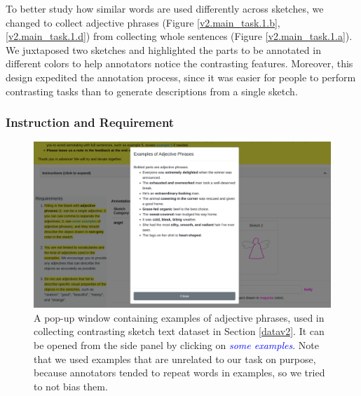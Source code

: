 To better study how similar words are used differently across sketches, we changed to collect adjective phrases (Figure \ref{v2.main_task.1.b}, \ref{v2.main_task.1.d}) from collecting whole sentences (Figure \ref{v2.main_task.1.a}).  
We juxtaposed two sketches and highlighted the parts to be annotated in different colors to help annotators notice the contrasting features. 
Moreover, this design expedited the annotation process, since it was easier for people to perform contrasting tasks than to generate descriptions from a single sketch. 


\subsubsection{Instruction and Requirement}

\begin{figure}[!htb]
\centering
\includegraphics[width=\linewidth]{data_collection/version2/v2annoPop.png}  
\caption{A pop-up window containing examples of adjective phrases, used in collecting contrasting sketch text dataset in Section \ref{datav2}. It can be opened from the side panel by clicking on \textcolor{blue}{\it{some examples}}. Note that we used examples that are unrelated to our task on purpose, because annotators tended to repeat words in examples, so we tried to not bias them.}
\label{v2.adjective.phrases}
\end{figure}

